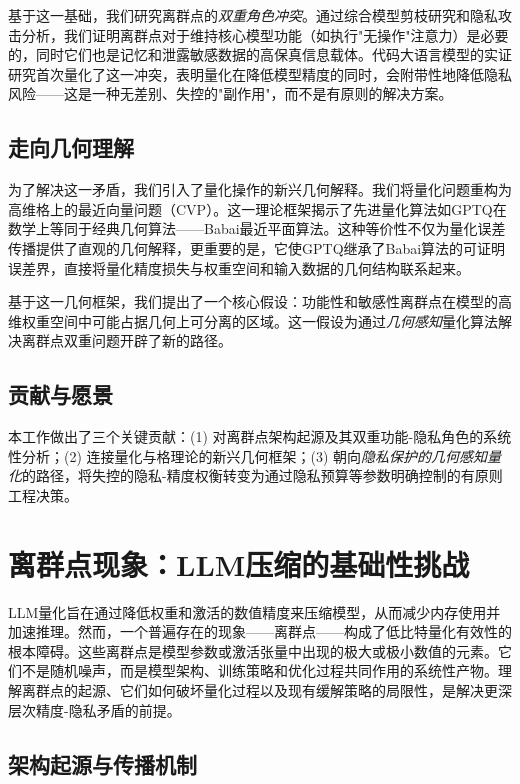 \documentclass[letterpaper,twocolumn,10pt]{article}
\begin{document}
基于这一基础，我们研究离群点的\emph{双重角色冲突}。通过综合模型剪枝研究和隐私攻击分析，我们证明离群点对于维持核心模型功能（如执行"无操作"注意力）是必要的，同时它们也是记忆和泄露敏感数据的高保真信息载体。代码大语言模型的实证研究首次量化了这一冲突，表明量化在降低模型精度的同时，会附带性地降低隐私风险——这是一种无差别、失控的"副作用"，而不是有原则的解决方案。

\subsection{走向几何理解}

为了解决这一矛盾，我们引入了量化操作的新兴几何解释。我们将量化问题重构为高维格上的最近向量问题（CVP）。这一理论框架揭示了先进量化算法如GPTQ在数学上等同于经典几何算法——Babai最近平面算法。这种等价性不仅为量化误差传播提供了直观的几何解释，更重要的是，它使GPTQ继承了Babai算法的可证明误差界，直接将量化精度损失与权重空间和输入数据的几何结构联系起来。

基于这一几何框架，我们提出了一个核心假设：功能性和敏感性离群点在模型的高维权重空间中可能占据几何上可分离的区域。这一假设为通过\emph{几何感知}量化算法解决离群点双重问题开辟了新的路径。

\subsection{贡献与愿景}

本工作做出了三个关键贡献：(1) 对离群点架构起源及其双重功能-隐私角色的系统性分析；(2) 连接量化与格理论的新兴几何框架；(3) 朝向\emph{隐私保护的几何感知量化}的路径，将失控的隐私-精度权衡转变为通过隐私预算等参数明确控制的有原则工程决策。

\section{离群点现象：LLM压缩的基础性挑战}

LLM量化旨在通过降低权重和激活的数值精度来压缩模型，从而减少内存使用并加速推理。然而，一个普遍存在的现象——离群点——构成了低比特量化有效性的根本障碍。这些离群点是模型参数或激活张量中出现的极大或极小数值的元素。它们不是随机噪声，而是模型架构、训练策略和优化过程共同作用的系统性产物。理解离群点的起源、它们如何破坏量化过程以及现有缓解策略的局限性，是解决更深层次精度-隐私矛盾的前提。

\subsection{架构起源与传播机制}
\end{document}
